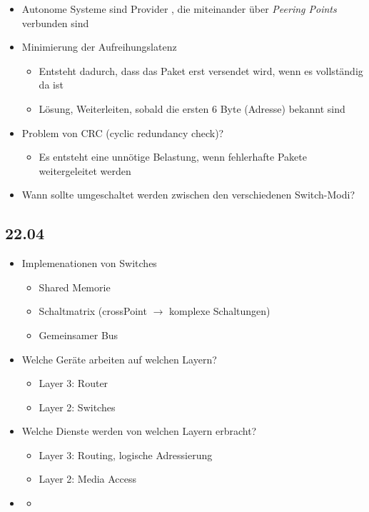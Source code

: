 \documentclass{article} %
\begin{document}
\begin{itemize}
\begin{itemize}
			\end{itemize}
		\item Autonome Systeme sind \glqq Provider \grqq, die miteinander über \textit{Peering Points} verbunden sind
		\item Minimierung der Aufreihungslatenz
			\begin{itemize}
				\item Entsteht dadurch, dass das Paket erst versendet wird, wenn es vollständig da ist
				\item Lösung, Weiterleiten, sobald die ersten 6 Byte (Adresse) bekannt sind
			\end{itemize}
		\item Problem von CRC (cyclic redundancy check)?
			\begin{itemize}
				\item Es entsteht eine unnötige Belastung, wenn fehlerhafte Pakete weitergeleitet werden
			\end{itemize}
		\item Wann sollte umgeschaltet werden zwischen den verschiedenen Switch-Modi?
	\end{itemize}
\subsection{22.04}
	\begin{itemize}
		\item Implemenationen von Switches
			\begin{itemize}
				\item Shared Memorie
				\item Schaltmatrix (crossPoint $\rightarrow$ komplexe Schaltungen)
				\item Gemeinsamer Bus
			\end{itemize}
		\item Welche Geräte arbeiten auf welchen Layern?
			\begin{itemize}
				\item Layer 3: Router
				\item Layer 2: Switches
			\end{itemize}		
		\item Welche Dienste werden von welchen Layern erbracht?
			\begin{itemize}
				\item Layer 3: Routing, logische Adressierung
				\item Layer 2: Media Access
			\end{itemize}
		\item 
			\begin{itemize}
				\item 
			\end{itemize}
	\end{itemize}
\end{document}
